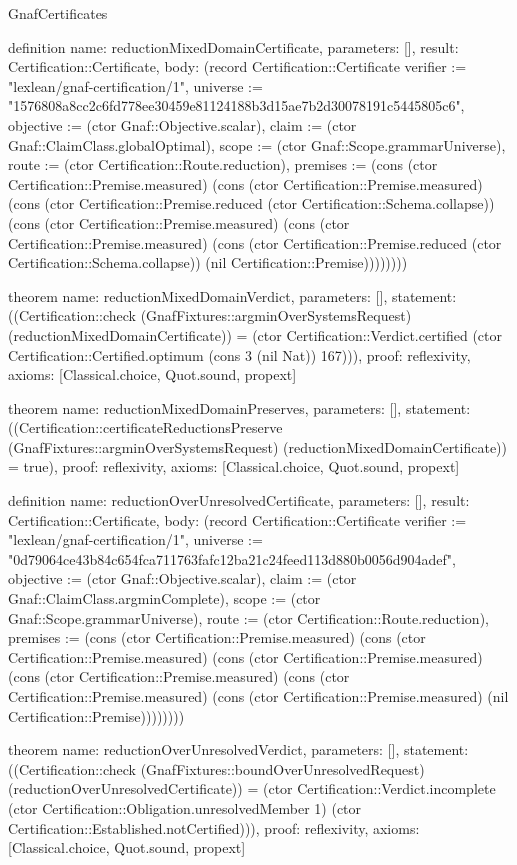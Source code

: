 \begin{lexlean}{GnafCertificates}
\begin{semanticmodule}
definition{
  name: reductionMixedDomainCertificate,
  parameters: [],
  result: Certification::Certificate,
  body: (record Certification::Certificate {verifier := "lexlean/gnaf-certification/1", universe := "1576808a8cc2c6fd778ee30459e81124188b3d15ae7b2d30078191c5445805c6", objective := (ctor Gnaf::Objective.scalar), claim := (ctor Gnaf::ClaimClass.globalOptimal), scope := (ctor Gnaf::Scope.grammarUniverse), route := (ctor Certification::Route.reduction), premises := (cons (ctor Certification::Premise.measured) (cons (ctor Certification::Premise.measured) (cons (ctor Certification::Premise.reduced (ctor Certification::Schema.collapse)) (cons (ctor Certification::Premise.measured) (cons (ctor Certification::Premise.measured) (cons (ctor Certification::Premise.reduced (ctor Certification::Schema.collapse)) (nil Certification::Premise)))))))})
}

theorem{
  name: reductionMixedDomainVerdict,
  parameters: [],
  statement: ((Certification::check (GnafFixtures::argminOverSystemsRequest) (reductionMixedDomainCertificate)) = (ctor Certification::Verdict.certified (ctor Certification::Certified.optimum (cons 3 (nil Nat)) 167))),
  proof: reflexivity{},
  axioms: [Classical.choice, Quot.sound, propext]
}

theorem{
  name: reductionMixedDomainPreserves,
  parameters: [],
  statement: ((Certification::certificateReductionsPreserve (GnafFixtures::argminOverSystemsRequest) (reductionMixedDomainCertificate)) = true),
  proof: reflexivity{},
  axioms: [Classical.choice, Quot.sound, propext]
}

definition{
  name: reductionOverUnresolvedCertificate,
  parameters: [],
  result: Certification::Certificate,
  body: (record Certification::Certificate {verifier := "lexlean/gnaf-certification/1", universe := "0d79064ce43b84c654fca711763fafc12ba21c24feed113d880b0056d904adef", objective := (ctor Gnaf::Objective.scalar), claim := (ctor Gnaf::ClaimClass.argminComplete), scope := (ctor Gnaf::Scope.grammarUniverse), route := (ctor Certification::Route.reduction), premises := (cons (ctor Certification::Premise.measured) (cons (ctor Certification::Premise.measured) (cons (ctor Certification::Premise.measured) (cons (ctor Certification::Premise.measured) (cons (ctor Certification::Premise.measured) (cons (ctor Certification::Premise.measured) (nil Certification::Premise)))))))})
}

theorem{
  name: reductionOverUnresolvedVerdict,
  parameters: [],
  statement: ((Certification::check (GnafFixtures::boundOverUnresolvedRequest) (reductionOverUnresolvedCertificate)) = (ctor Certification::Verdict.incomplete (ctor Certification::Obligation.unresolvedMember 1) (ctor Certification::Established.notCertified))),
  proof: reflexivity{},
  axioms: [Classical.choice, Quot.sound, propext]
}


\end{semanticmodule}
\end{lexlean}
